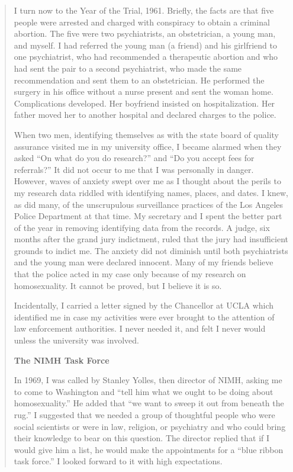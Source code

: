 \begin{refsection}
\begin{quote}
I turn now to the Year of the Trial, 1961. Briefly, the facts are that five people were arrested and charged with conspiracy to obtain a criminal abortion. The five were two psychiatrists, an obstetrician, a young man, and myself. I had referred the young man (a friend) and his girlfriend to one psychiatrist, who had recommended a therapeutic abortion and who had sent the pair to a second psychiatrist, who made the same recommendation and sent them to an obstetrician. He performed the surgery in his office without a nurse present and sent the woman home. Complications developed. Her boyfriend insisted on hospitalization. Her father moved her to another hospital and declared charges to the police.

When two men, identifying themselves as with the state board of quality assurance visited me in my university office, I became alarmed when they asked ``On what do you do research?'' and ``Do you accept fees for referrals?'' It did not occur to me that I was personally in danger. However, waves of anxiety swept over me as I thought about the perils to my research data riddled with identifying names, places, and dates. I knew, as did many, of the unscrupulous surveillance practices of the Los Angeles Police Department at that time. My secretary and I spent the better part of the year in removing identifying data from the records. A judge, six months after the grand jury indictment, ruled that the jury had insufficient grounds to indict me. The anxiety did not diminish until both psychiatrists and the young man were declared innocent. Many of my friends believe that the police acted in my case only because of my research on homosexuality. It cannot be proved, but I believe it is so.

Incidentally, I carried a letter signed by the Chancellor at UCLA which identified me in case my activities were ever brought to the attention of law enforcement authorities. I never needed it, and felt I never would unless the university was involved.

\textbf{The NIMH Task Force} 

In 1969, I was called by Stanley Yolles, then director of NIMH, asking me to come to Washington and ``tell him what we ought to be doing about homosexuality.'' He added that ``we want to sweep it out from beneath the rug.'' I suggested that we needed a group of thoughtful people who were social scientists or were in law, religion, or psychiatry and who could bring their knowledge to bear on this question. The director replied that if I would give him a list, he would make the appointments for a ``blue ribbon task force.'' I looked forward to it with high expectations.


\end{quote}
\end{refsection}
